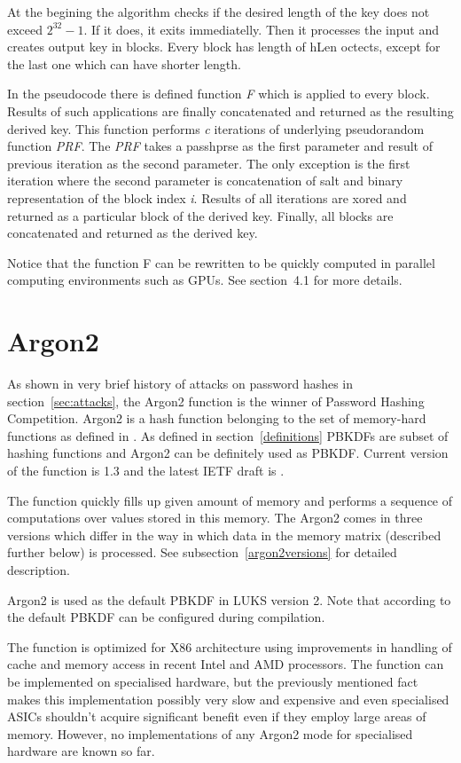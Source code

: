 \documentclass[nolof]{fithesis3}
\begin{document}
At the begining the algorithm checks if the desired length of the key does not exceed \(2^{32} - 1\). If it does, it exits immediatelly. Then it processes the input and creates output key in blocks. Every block has length of hLen octects, except for the last one which can have shorter length. 

In the pseudocode there is defined function \emph{F} which is applied to every block. Results of such applications are finally concatenated and returned as the resulting derived key. This function performs \emph{c} iterations of underlying pseudorandom function \emph{PRF}. The \emph{PRF} takes a passhprse as the first parameter and result of previous iteration as the second parameter. The only exception is the first iteration where the second parameter is concatenation of salt and binary representation of the block index \emph{i}. Results of all iterations are xored and returned as a particular block of the derived key. Finally, all blocks are concatenated and returned as the derived key.

Notice that the function F can be rewritten to be quickly computed in parallel computing environments such as GPUs. See \parencite{mosnacek}{section~4.1} for more details.


\section{Argon2}
\label{argon2}
As shown in very brief history of attacks on password hashes in section~\ref{sec:attacks}, the Argon2 function is the winner of Password Hashing Competition. Argon2 is a hash function belonging to the set of memory-hard functions as defined in \parencite{memoryhard}. As defined in section~\ref{definitions} PBKDFs are subset of hashing functions and Argon2 can be definitely used as PBKDF. Current version of the function is 1.3 and the latest IETF draft is \parencite{argon2draft}.

The function quickly fills up given amount of memory and performs a sequence of computations over values stored in this memory. The Argon2 comes in three versions which differ in the way in which data in the memory matrix (described further below) is processed. See subsection~\ref{argon2versions} for detailed description.

Argon2 is used as the default PBKDF in LUKS version 2. Note that according to \parencite{cryptsetupmanual} the default PBKDF can be configured during compilation.

The function is optimized for X86 architecture using improvements in handling of cache and memory access in recent Intel and AMD processors. The function can be implemented on specialised hardware, but the previously mentioned fact makes this implementation possibly very slow and expensive and even specialised ASICs shouldn't acquire significant benefit even if they employ large areas of memory. However, no implementations of any Argon2 mode for specialised hardware are known so far.
\end{document}
